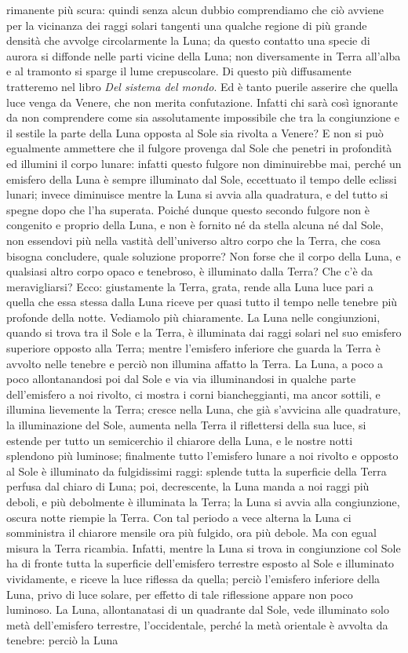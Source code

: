 \documentclass[11pt,twoside,openany]{book}
\begin{document}
rimanente più scura: quindi senza alcun dubbio comprendiamo che ciò avviene per la vicinanza dei raggi solari tangenti una qualche regione di più grande densità che avvolge circolarmente la Luna; da questo contatto una specie di aurora si diffonde nelle parti vicine della Luna; non diversamente in Terra all'alba e al tramonto si sparge il lume crepuscolare. Di questo più diffusamente tratteremo nel libro \textit{Del sistema del mondo}. Ed è tanto puerile asserire che quella luce venga da Venere, che non merita confutazione. Infatti chi sarà così ignorante da non comprendere come sia assolutamente impossibile che tra la congiunzione e il sestile la parte della Luna opposta al Sole sia rivolta a Venere? E non si può egualmente ammettere che il fulgore provenga dal Sole che penetri in profondità ed illumini il corpo lunare: infatti questo fulgore non diminuirebbe mai, perché un emisfero della Luna è sempre illuminato dal Sole, eccettuato il tempo delle eclissi lunari; invece diminuisce mentre la Luna si avvia alla quadratura, e del tutto si spegne dopo che l'ha superata. Poiché dunque questo secondo fulgore non è congenito e proprio della Luna, e non è fornito né da stella alcuna né dal Sole, non essendovi più nella vastità dell'universo altro corpo che la Terra, che cosa bisogna concludere, quale soluzione proporre? Non forse che il corpo della Luna, e qualsiasi altro corpo opaco e tenebroso, è illuminato dalla Terra? Che c'è da meravigliarsi? Ecco: giustamente la Terra, grata, rende alla Luna luce pari a quella che essa stessa dalla Luna riceve per quasi tutto il tempo nelle tenebre più profonde della notte. Vediamolo più chiaramente. La Luna nelle congiunzioni, quando si trova tra il Sole e la Terra, è illuminata dai raggi solari nel suo emisfero superiore opposto alla Terra; mentre l'emisfero inferiore che guarda la Terra è avvolto nelle tenebre e perciò non illumina affatto la Terra. La Luna, a poco a poco allontanandosi poi dal Sole e via via illuminandosi in qualche parte dell'emisfero a noi rivolto, ci mostra i corni biancheggianti, ma ancor sottili, e illumina lievemente la Terra; cresce nella Luna, che già s'avvicina alle quadrature, la illuminazione del Sole, aumenta nella Terra il riflettersi della sua luce, si estende per tutto un semicerchio il chiarore della Luna, e le nostre notti splendono più luminose; finalmente tutto l'emisfero lunare a noi rivolto e opposto al Sole è illuminato da fulgidissimi raggi: splende tutta la superficie della Terra perfusa dal chiaro di Luna; poi, decrescente, la Luna manda a noi raggi più deboli, e più debolmente è illuminata la Terra; la Luna si avvia alla congiunzione, oscura notte riempie la Terra. Con tal periodo a vece alterna la Luna ci somministra il chiarore mensile ora più fulgido, ora più debole. Ma con egual misura la Terra ricambia. Infatti, mentre la Luna si trova in congiunzione col Sole ha di fronte tutta la superficie dell'emisfero terrestre esposto al Sole e illuminato vividamente, e riceve la luce riflessa da quella; perciò l'emisfero inferiore della Luna, privo di luce solare, per effetto di tale riflessione appare non poco luminoso. La Luna, allontanatasi di un quadrante dal Sole, vede illuminato solo metà dell'emisfero terrestre, l'occidentale, perché la metà orientale è avvolta da tenebre: perciò la Luna 
\end{document}
